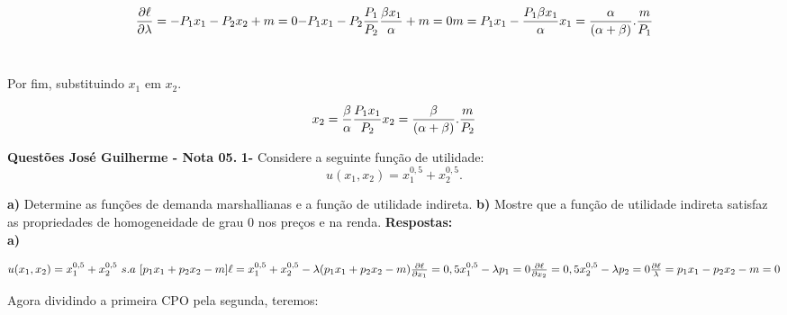 \documentclass[a4paper, 12pt]{article} %
\begin{document}
\begin{flushleft}
	\begin{equation}
		\frac{\partial\ell}{\partial \lambda} = -P_{1}x_{1} - P_{2}x_{2} + m = 0 
		$$\\$$
		-P_{1}x_{1} - P_{2}\dfrac{P_{1}}{P_{2}}\dfrac{\beta x_{1}}{\alpha} + m = 0
		$$\\$$
		m = P_{1}x_{1} - \dfrac{P_{1}{\beta x_{1}}}{\alpha} 
		$$\\$$
		x_{1} = \dfrac{\alpha}{(\alpha + \beta)}.\dfrac{m}{P_{1}}
	\end{equation}
	\\
	\begin{center}
		Por fim, substituindo $x_{1}$ em $x_{2}$.
	\end{center}

	\begin{equation}
		x_{2} = \dfrac{\beta}{\alpha}\dfrac{P_{1}x_{1}}{P_{2}}
		$$\\$$
		x_{2} = \dfrac{\beta}{(\alpha + \beta)}.\dfrac{m}{P_{2}}
	\end{equation}
\singlespacing

\textbf{Questões José Guilherme - Nota 05.}
\singlespacing
\textbf{1-} Considere a seguinte função de utilidade:
\\

	$$u(x_{1},x_{2}) = x_{1}^{0,5} + x_{2}^{0,5}.$$

\textbf{a)} Determine as funções de demanda marshallianas e a função de utilidade indireta.
\singlespacing
\textbf{b)} Mostre que a função de utilidade indireta satisfaz as propriedades de homogeneidade de grau 0 nos preços e na renda.
\singlespacing
\textbf{Respostas:}
\\
\textbf{a)}
\singlespacing

\begin{equation}
	u(x_{1},x_{2}) = x_{1}^{0,5} + x_{2}^{0,5}  \ s.a \ [p_{1}x_{1} + p_{2}x_{2} - m] $$\\$$
	\ell = x_{1}^{0,5} + x_{2}^{0,5} - \lambda (p_{1}x_{1} + p_{2}x_{2} - m) $$\\$$
	\frac{\partial\ell}{\partial x_{1}} = 0,5x_{1}^{0,5} - \lambda p_{1} = 0
	$$\\$$
	\frac{\partial\ell}{\partial x_{2}} = 0,5x_{2}^{0,5} - \lambda p_{2} = 0
	$$\\$$
	\frac{\partial\ell}{\lambda} = p_{1}x_{1} - p_{2}x_{2} - m = 0
\end{equation}
\singlespacing
\begin{center}
	
Agora dividindo a primeira CPO pela segunda, teremos:
\end{center}


\end{flushleft}
\end{document}
